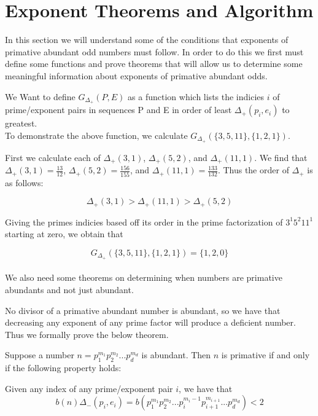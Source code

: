 \documentclass[../paper.tex]{subfiles}
\begin{document}
\section{Exponent Theorems and Algorithm}

In this section we will understand some of the conditions that
exponents of primative abundant odd numbers must follow. In order
to do this we first must define some functions and prove theorems 
that will allow us to determine some meaningful information about
exponents of primative abundant odds.

We Want to define $G_{\Delta_{+}}(P,E)$ as a function which lists
the indicies $i$ of prime/exponent pairs in sequences P and E
in order of least $\Delta_{+}(p_i, e_i)$ to greatest.
\\

To demonstrate the above function, we calculate 
$G_{\Delta_{+}}(\{3,5,11\}, \{1,2,1\})$.

First we calculate each of $\Delta_{+}(3,1)$, $\Delta_{+}(5,2)$, 
and $\Delta_{+}(11,1)$. We find that 
$\Delta_{+}(3,1) = \frac{13}{12}$,
$\Delta_{+}(5,2) = \frac{156}{155}$, and
$\Delta_{+}(11,1)= \frac{133}{132}$.
Thus the order of $\Delta_{+}$ is as follows:

$$ \Delta_{+}(3,1) > \Delta_{+}(11,1) > \Delta_{+}(5,2)$$

Giving the primes indicies based off its order in the prime
factorization of $3^1 5^2 11^1$ starting at zero, we obtain that

$$G_{\Delta_{+}}(\{3,5,11\}, \{1,2,1\}) = \{1,2,0\}$$
\\

We also need some theorems on determining when numbers are 
primative abundants and not just abundant.

No divisor of a primative abundant number is abundant, so 
we have that decreasing any exponent of any prime factor will
produce a deficient number. Thus we formally prove the below
theorem.

\begin{theorem}
Suppose a number $n = p_1^{m_1} p_2^{m_2} ... p_d^{m_d}$ is 
abundant. Then $n$ is primative if and only if the 
following property holds:

Given any index of any prime/exponent pair $i$, we have that
$$b(n) \Delta_{-}(p_i, e_i) = b(p_1^{m_1} p_2^{m_2} ...  
p_i^{m_i - 1} p_{i+1}^{m_{i+1}}... p_d^{m_d}) < 2$$
\end{theorem}
\end{document}
